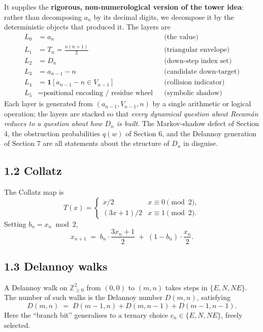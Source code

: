 \documentclass[
  11pt,
]{article}
\begin{document}
It supplies the \textbf{rigorous, non-numerological version of the tower
idea}: rather than decomposing \(a_n\) by its decimal digits, we
decompose it by the deterministic objects that produced it. The layers
are \[
\begin{aligned}
L_0 &= a_n & &\text{(the value)} \\
L_1 &= T_n = \tfrac{n(n+1)}{2} & &\text{(triangular envelope)} \\
L_2 &= D_n & &\text{(down-step index set)} \\
L_3 &= a_{n-1} - n & &\text{(candidate down-target)} \\
L_4 &= \mathbf{1}[a_{n-1} - n \in V_{n-1}] & &\text{(collision indicator)} \\
L_5 &= \text{positional encoding / residue wheel} & &\text{(symbolic shadow)}
\end{aligned}
\] Each layer is generated from \((a_{n-1}, V_{n-1}, n)\) by a single
arithmetic or logical operation; the layers are stacked so that
\emph{every dynamical question about Recamán reduces to a question about
how \(D_n\) is built}. The Markov-shadow defect of Section 4, the
obstruction probabilities \(q(w)\) of Section 6, and the Delannoy
generation of Section 7 are all statements about the structure of
\(D_n\) in disguise.

\hypertarget{collatz}{%
\subsection{1.2 Collatz}\label{collatz}}

The Collatz map is \[
T(x) = \begin{cases} x/2 & x \equiv 0 \pmod 2, \\ (3x+1)/2 & x \equiv 1 \pmod 2. \end{cases}
\] Setting \(b_n = x_n \bmod 2\), \[
x_{n+1} \;=\; b_n \cdot \frac{3x_n + 1}{2} \;+\; (1 - b_n) \cdot \frac{x_n}{2}.
\]

\hypertarget{delannoy-walks}{%
\subsection{1.3 Delannoy walks}\label{delannoy-walks}}

A Delannoy walk on \(\mathbb{Z}_{\ge 0}^2\) from \((0,0)\) to \((m,n)\)
takes steps in \(\{E, N, NE\}\). The number of such walks is the
Delannoy number \(D(m,n)\), satisfying \[
D(m,n) \;=\; D(m-1, n) + D(m, n-1) + D(m-1, n-1).
\] Here the ``branch bit'' generalises to a ternary choice
\(c_n \in \{E, N, NE\}\), freely selected.
\end{document}
